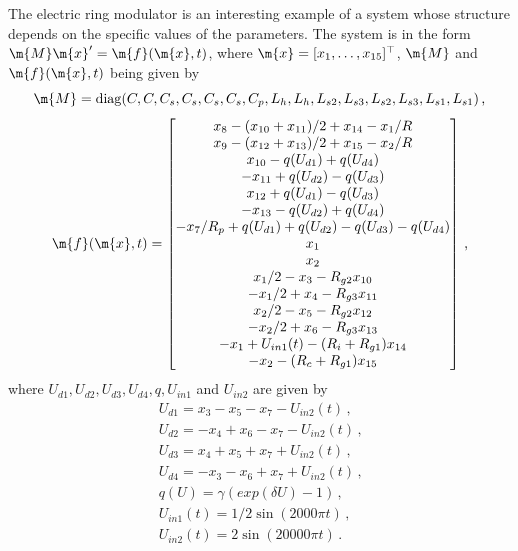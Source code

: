 The electric ring modulator is an interesting example of a system whose structure depends on the specific values of the parameters. The system is in the form $\m{M}\m{x}^\prime = \m{f}(\m{x},t)$, where $\m{x} = [x_1, \dots, x_{15}]^\top$, $\m{M}$ and $\m{f}(\m{x},t)$ being given by
%
\begin{equation}
  \m{M} = \mathrm{diag}(C, C, C_s, C_s, C_s, C_s, C_p, L_h, L_h, L_{s2}, L_{s3}, L_{s2}, L_{s3}, L_{s1}, L_{s1}) \, \text{,}
\end{equation}
%
\begin{equation}
  \m{f}(\m{x},t) = \begin{bmatrix}
    x_8 - (x_{10} + x_{11})/2 + x_{14} - x_1/R \\
    x_9 - (x_{12} + x_{13})/2 + x_{15} - x_2/R \\
    x_{10} - q(U_{d1}) + q(U_{d4}) \\
    -x_{11} + q(U_{d2}) - q(U_{d3}) \\
    x_{12} + q(U_{d1}) - q(U_{d3}) \\
    -x_{13} - q(U_{d2}) + q(U_{d4}) \\
    -x_7/R_p + q(U_{d1}) + q(U_{d2}) - q(U_{d3}) - q(U_{d4}) \\
    x_1 \\
    x_2 \\
    x_1/2 - x_3 - R_{g2}x_{10} \\
    -x_1/2 + x_4 - R_{g3}x_{11} \\
    x_2/2 - x_5 - R_{g2}x_{12} \\
    -x_2/2 + x_6 - R_{g3}x_{13} \\
    -x_1 + U_{in1}(t) - (R_i + R_{g1})x_{14} \\
    -x_2 - (R_c+R_{g1})x_{15}
  \end{bmatrix} \, \text{,}
\end{equation}
%
where $U_{d1}, U_{d2}, U_{d3}, U_{d4}, q, U_{in1}$ and $U_{in2}$ are given by
%
\begin{equation}
  \begin{array}{l}
    U_{d1} = x_3 - x_5 - x_7 - U_{in2}(t) \, \text{,} \\
    U_{d2} = -x_4 + x_6 - x_7 - U_{in2}(t) \, \text{,} \\
    U_{d3} = x_4 + x_5 + x_7 + U_{in2}(t) \, \text{,} \\
    U_{d4} = -x_3 - x_6 + x_7 + U_{in2}(t) \, \text{,} \\
    q(U) = \gamma(exp(\delta U) - 1) \, \text{,} \\
    U_{in1}(t) = 1/2 \sin(2000 \pi t) \, \text{,} \\
    U_{in2}(t) = 2 \sin(20000 \pi t) \, \text{.}
  \end{array}
\end{equation}
